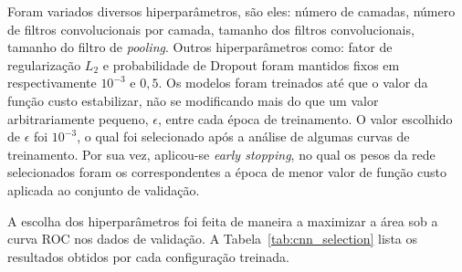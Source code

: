 Foram variados diversos hiperparâmetros, são eles: número de camadas, número de filtros convolucionais por camada,
tamanho dos filtros convolucionais, tamanho do filtro de \textit{pooling}.
Outros hiperparâmetros como: fator de regularização $L_{2}$ e probabilidade de Dropout foram mantidos fixos em
respectivamente $10^{-3}$ e $0,5$.
Os modelos foram treinados até que o valor da função custo estabilizar, não se modificando mais do que um valor
arbitrariamente pequeno, $\epsilon$, entre cada época de treinamento.
O valor escolhido de $\epsilon$ foi $10^{-3}$, o qual foi selecionado após a análise de algumas curvas de treinamento.
Por sua vez, aplicou-se \textit{early stopping}, no qual os pesos da rede selecionados foram os correspondentes a época
de menor valor de função custo aplicada ao conjunto de validação.

A escolha dos hiperparâmetros foi feita de maneira a maximizar a área sob a curva ROC nos dados de validação.
A Tabela~\ref{tab:cnn_selection} lista os resultados obtidos por cada configuração treinada.

